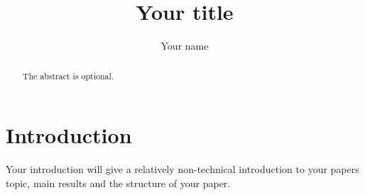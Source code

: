 \documentclass[12pt]{article}
\begin{document}
\title{Your title}
\author{Your name}

\maketitle

\begin{abstract} The abstract is optional. 
\end{abstract}

\section{Introduction} 
Your introduction will give a relatively
non-technical introduction to your papers topic, main results and the
structure of your paper.
\end{document}
